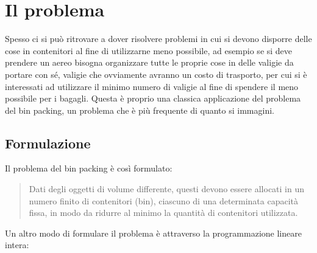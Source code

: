 \section{Il problema}
Spesso ci si può ritrovare a dover risolvere problemi in cui si devono disporre delle cose in contenitori al fine
di utilizzarne meno possibile, ad esempio se si deve prendere un aereo bisogna organizzare tutte le proprie cose in delle
valigie da portare con sé, valigie che ovviamente avranno un costo di trasporto, per cui si è interessati ad
utilizzare il minimo numero di valigie al fine di spendere il meno possibile per i bagagli. Questa è proprio una
classica applicazione del problema del bin packing, un problema che è più frequente di quanto si immagini.

\subsection{Formulazione}
Il problema del bin packing è così formulato:
\begin{quote}
	Dati degli oggetti di volume differente, questi devono essere allocati in un numero finito di
	contenitori (bin), ciascuno di una determinata capacità fissa, in modo da ridurre al minimo la
	quantità di contenitori utilizzata.
\end{quote}
\noindent
Un altro modo di formulare il problema è attraverso la programmazione lineare intera:
